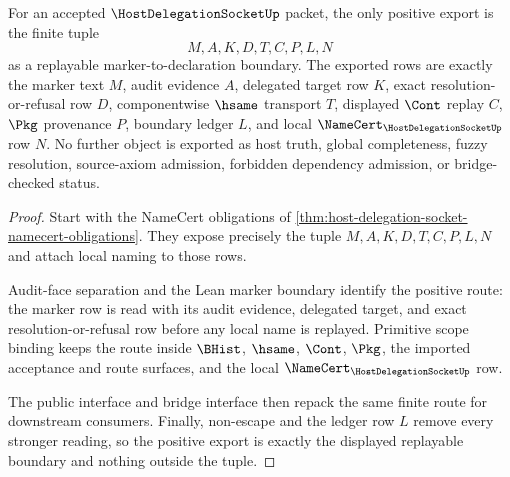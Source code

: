 \begin{theorem}
\label{thm:host-delegation-socket-positive-boundary}
For an accepted $\HostDelegationSocketUp$ packet, the only positive export is the finite tuple
$$
M,A,K,D,T,C,P,L,N
$$
as a replayable marker-to-declaration boundary. The exported rows are exactly the marker text $M$, audit evidence $A$, delegated target row $K$, exact resolution-or-refusal row $D$, componentwise $\hsame$ transport $T$, displayed $\Cont$ replay $C$, $\Pkg$ provenance $P$, boundary ledger $L$, and local $\NameCert_{\HostDelegationSocketUp}$ row $N$. No further object is exported as host truth, global completeness, fuzzy resolution, source-axiom admission, forbidden dependency admission, or bridge-checked status.
\end{theorem}
\begin{proof}
Start with the NameCert obligations of \autoref{thm:host-delegation-socket-namecert-obligations}. They expose precisely the tuple $M,A,K,D,T,C,P,L,N$ and attach local naming to those rows.

Audit-face separation and the Lean marker boundary identify the positive route: the marker row is read with its audit evidence, delegated target, and exact resolution-or-refusal row before any local name is replayed. Primitive scope binding keeps the route inside $\BHist$, $\hsame$, $\Cont$, $\Pkg$, the imported acceptance and route surfaces, and the local $\NameCert_{\HostDelegationSocketUp}$ row.

The public interface and bridge interface then repack the same finite route for downstream consumers. Finally, non-escape and the ledger row $L$ remove every stronger reading, so the positive export is exactly the displayed replayable boundary and nothing outside the tuple.
\end{proof}


